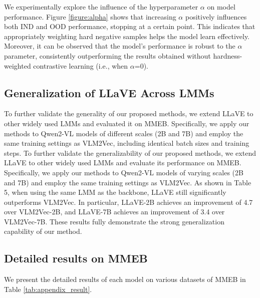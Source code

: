 \documentclass[11pt]{article}
\begin{document}
We experimentally explore the influence of the hyperparameter $\alpha$ on model performance. Figure \ref{figure:alpha} shows that increasing $\alpha$ positively influences both IND and OOD performance, stopping at a certain point. This indicates that appropriately weighting hard negative samples helps the model learn effectively. Moreover, it can be observed that the model's performance is robust to the $\alpha$ parameter, consistently outperforming the results obtained without hardness-weighted contrastive learning (i.e., when $\alpha$=0).

\subsection{Generalization of LLaVE Across LMMs}
To further validate the generality of our proposed methods, we extend LLaVE to other widely used LMMs and evaluated it on MMEB. Specifically, we apply our methods to Qwen2-VL models of different scales (2B and 7B) and employ the same training settings as VLM2Vec, including identical batch sizes and training steps.
To further validate the generalizability of our proposed methods, we extend LLaVE to other widely used LMMs and evaluate its performance on MMEB. Specifically, we apply our methods to Qwen2-VL models of varying scales (2B and 7B) and employ the same training settings as VLM2Vec. As shown in Table 5, when using the same LMM as the backbone, LLaVE still significantly outperforms VLM2Vec. In particular, LLaVE-2B achieves an improvement of 4.7 over VLM2Vec-2B, and LLaVE-7B achieves an improvement of 3.4 over VLM2Vec-7B. These results fully demonstrate the strong generalization capability of our method.

\subsection{Detailed results on MMEB}
\label{sec:detailed_result}
We present the detailed results of each model on various datasets of MMEB in Table \ref{tab:appendix_result}.
\end{document}
